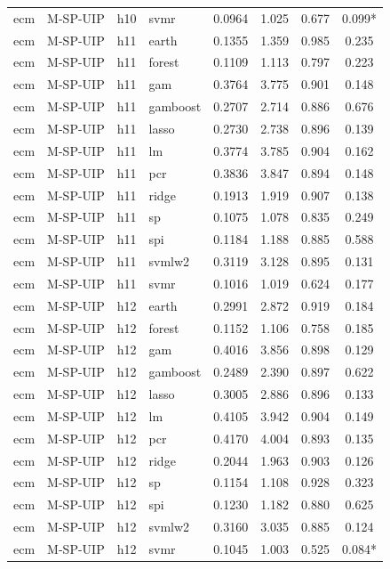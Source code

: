 \begin{ThreePartTable}
\begin{longtable}[t]{llclcccc}
ecm & M-SP-UIP & h10 & svmr & 0.0964 & 1.025 & 0.677 & 0.099*\\
\addlinespace
ecm & M-SP-UIP & h11 & earth & 0.1355 & 1.359 & 0.985 & 0.235\\
ecm & M-SP-UIP & h11 & forest & 0.1109 & 1.113 & 0.797 & 0.223\\
ecm & M-SP-UIP & h11 & gam & 0.3764 & 3.775 & 0.901 & 0.148\\
ecm & M-SP-UIP & h11 & gamboost & 0.2707 & 2.714 & 0.886 & 0.676\\
ecm & M-SP-UIP & h11 & lasso & 0.2730 & 2.738 & 0.896 & 0.139\\
ecm & M-SP-UIP & h11 & lm & 0.3774 & 3.785 & 0.904 & 0.162\\
ecm & M-SP-UIP & h11 & pcr & 0.3836 & 3.847 & 0.894 & 0.148\\
ecm & M-SP-UIP & h11 & ridge & 0.1913 & 1.919 & 0.907 & 0.138\\
ecm & M-SP-UIP & h11 & sp & 0.1075 & 1.078 & 0.835 & 0.249\\
ecm & M-SP-UIP & h11 & spi & 0.1184 & 1.188 & 0.885 & 0.588\\
ecm & M-SP-UIP & h11 & svmlw2 & 0.3119 & 3.128 & 0.895 & 0.131\\
ecm & M-SP-UIP & h11 & svmr & 0.1016 & 1.019 & 0.624 & 0.177\\
\addlinespace
ecm & M-SP-UIP & h12 & earth & 0.2991 & 2.872 & 0.919 & 0.184\\
ecm & M-SP-UIP & h12 & forest & 0.1152 & 1.106 & 0.758 & 0.185\\
ecm & M-SP-UIP & h12 & gam & 0.4016 & 3.856 & 0.898 & 0.129\\
ecm & M-SP-UIP & h12 & gamboost & 0.2489 & 2.390 & 0.897 & 0.622\\
ecm & M-SP-UIP & h12 & lasso & 0.3005 & 2.886 & 0.896 & 0.133\\
ecm & M-SP-UIP & h12 & lm & 0.4105 & 3.942 & 0.904 & 0.149\\
ecm & M-SP-UIP & h12 & pcr & 0.4170 & 4.004 & 0.893 & 0.135\\
ecm & M-SP-UIP & h12 & ridge & 0.2044 & 1.963 & 0.903 & 0.126\\
ecm & M-SP-UIP & h12 & sp & 0.1154 & 1.108 & 0.928 & 0.323\\
ecm & M-SP-UIP & h12 & spi & 0.1230 & 1.182 & 0.880 & 0.625\\
ecm & M-SP-UIP & h12 & svmlw2 & 0.3160 & 3.035 & 0.885 & 0.124\\
ecm & M-SP-UIP & h12 & svmr & 0.1045 & 1.003 & 0.525 & 0.084*\\

\end{longtable}
\end{ThreePartTable}
